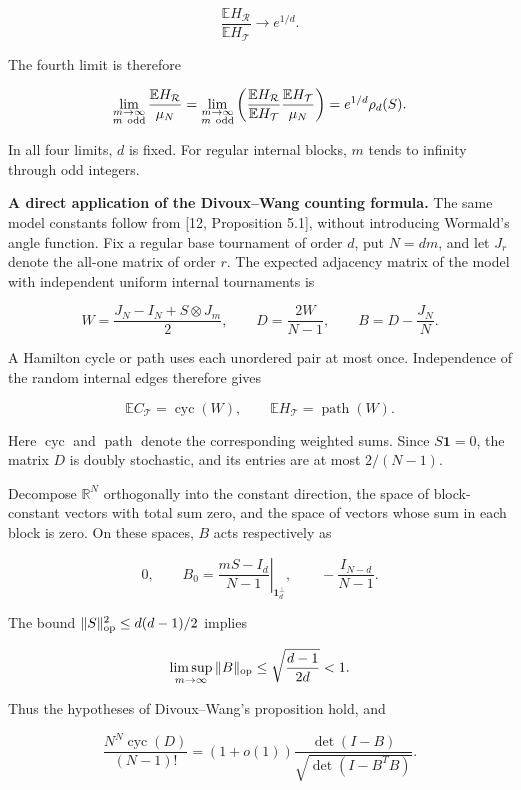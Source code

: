 \documentclass[11pt,a4paper]{article}
\begin{document}
\[
\frac{\mathbb EH_{\mathcal R}}{\mathbb EH_{\mathcal T}}
\longrightarrow e^{1/d}.
\]

The fourth limit is therefore

\[
\lim_{\substack{m\to\infty\\m\ {\rm odd}}}
\frac{\mathbb EH_{\mathcal R}}{\mu_N}
=\lim_{\substack{m\to\infty\\m\ {\rm odd}}}
\left(\frac{\mathbb EH_{\mathcal R}}{\mathbb EH_{\mathcal T}}
\frac{\mathbb EH_{\mathcal T}}{\mu_N}\right)
=e^{1/d}\rho_d(S).
\]

In all four limits, \(d\) is fixed. For regular internal blocks, \(m\) tends to infinity through odd integers.

\textbf{A direct application of the Divoux--Wang counting formula.} The same model constants follow from {[}12, Proposition 5.1{]}, without introducing Wormald's angle function. Fix a regular base tournament of order \(d\), put \(N=dm\), and let \(J_r\) denote the all-one matrix of order \(r\). The expected adjacency matrix of the model with independent uniform internal tournaments is

\[
W=\frac{J_N-I_N+S\otimes J_m}{2},\qquad
D=\frac{2W}{N-1},\qquad
B=D-\frac{J_N}{N}.
\]

A Hamilton cycle or path uses each unordered pair at most once. Independence of the random internal edges therefore gives

\[
\mathbb EC_{\mathcal T}=\operatorname{cyc}(W),\qquad
\mathbb EH_{\mathcal T}=\operatorname{path}(W).
\]

Here \(\operatorname{cyc}\) and \(\operatorname{path}\) denote the corresponding weighted sums. Since \(S\mathbf1=0\), the matrix \(D\) is doubly stochastic, and its entries are at most \(2/(N-1)\).

Decompose \(\mathbb R^N\) orthogonally into the constant direction, the space of block-constant vectors with total sum zero, and the space of vectors whose sum in each block is zero. On these spaces, \(B\) acts respectively as

\[
0,\qquad
B_0=\left.\frac{mS-I_d}{N-1}\right|_{\mathbf1_d^\perp},
\qquad -\frac{I_{N-d}}{N-1}.
\]

The bound \(\|S\|_{\rm op}^2\le d(d-1)/2\) implies

\[
\limsup_{m\to\infty}\|B\|_{\rm op}
\le\sqrt{\frac{d-1}{2d}}<1.
\]

Thus the hypotheses of Divoux--Wang's proposition hold, and

\[
\frac{N^N\operatorname{cyc}(D)}{(N-1)!}
=(1+o(1))\frac{\det(I-B)}{\sqrt{\det(I-B^TB)}}.
\]
\end{document}
